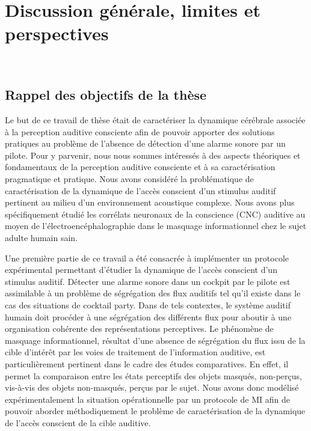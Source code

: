 \chapter{Discussion générale, limites et perspectives}
\label{chapitre6}

\noindent \hrulefill \\

\section{Rappel des objectifs de la thèse}

Le but de ce travail de thèse était de caractériser la dynamique cérébrale associée à la perception auditive consciente afin de pouvoir apporter des solutions pratiques au problème de l'absence de détection d'une alarme sonore par un pilote. 
Pour y parvenir, nous nous sommes intéressés à des aspects théoriques et fondamentaux de la perception auditive consciente et à sa caractérisation pragmatique et pratique. 
Nous avons considéré la problématique de caractérisation de la dynamique de l'accès conscient d'un stimulus auditif pertinent au milieu d'un environnement acoustique complexe. 
Nous avons plus spécifiquement étudié les corrélats neuronaux de la conscience (CNC) auditive au moyen de l'électroencéphalographie dans le masquage informationnel chez le sujet adulte humain sain. 

Une première partie de ce travail a été consacrée à implémenter un protocole expérimental permettant d'étudier la dynamique de l'accès conscient d'un stimulus auditif. 
Détecter une alarme sonore dans un cockpit par le pilote est assimilable à un problème de ségrégation des flux auditifs tel qu'il existe dans le cas des situations de cocktail party. 
Dans de tels contextes, le système auditif humain doit procéder à une ségrégation des différents flux pour aboutir à une organisation cohérente des représentations perceptives. 
Le phénomène de masquage informationnel, résultat d'une absence de ségrégation du flux issu de la cible d'intérêt par les voies de traitement de l'information auditive, est particulièrement pertinent dans le cadre des études comparatives. 
En effet, il permet la comparaison entre les états perceptifs des objets masqués, non-perçus, vis-à-vis des objets non-masqués, perçus par le sujet. 
Nous avons donc modélisé expérimentalement la situation opérationnelle par un protocole de MI afin de pouvoir aborder méthodiquement le problème de caractérisation de la dynamique de l'accès conscient de la cible auditive. 

